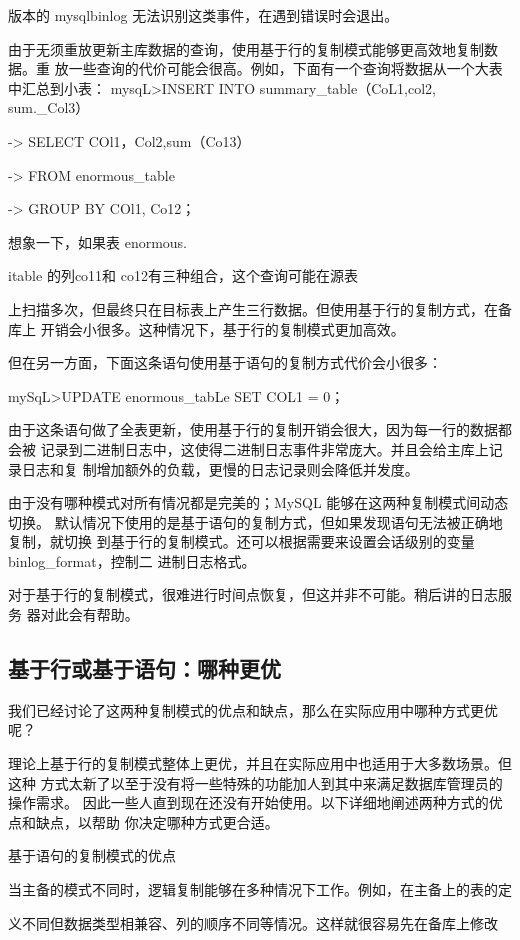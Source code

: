 版本的 mysqlbinlog 无法识别这类事件，在遇到错误时会退出。

由于无须重放更新主库数据的查询，使用基于行的复制模式能够更高效地复制数据。重
放一些查询的代价可能会很高。例如，下面有一个查询将数据从一个大表中汇总到小表：
mysqL>INSERT INTO summary\_table（CoL1,col2, sum.\_Col3）

-> SELECT COl1，Col2,sum（Co13）

-> FROM enormous\_table

-> GROUP BY COl1, Co12；

想象一下，如果表 enormous.

itable 的列co11和 co12有三种组合，这个查询可能在源表

上扫描多次，但最终只在目标表上产生三行数据。但使用基于行的复制方式，在备库上
开销会小很多。这种情况下，基于行的复制模式更加高效。

但在另一方面，下面这条语句使用基于语句的复制方式代价会小很多：

mySqL>UPDATE enormous\_tabLe SET COL1 = 0；

由于这条语句做了全表更新，使用基于行的复制开销会很大，因为每一行的数据都会被
记录到二进制日志中，这使得二进制日志事件非常庞大。并且会给主库上记录日志和复
制增加额外的负载，更慢的日志记录则会降低并发度。

由于没有哪种模式对所有情况都是完美的；MySQL 能够在这两种复制模式间动态切换。
默认情况下使用的是基于语句的复制方式，但如果发现语句无法被正确地复制，就切换
到基于行的复制模式。还可以根据需要来设置会话级别的变量 binlog\_format，控制二
进制日志格式。

对于基于行的复制模式，很难进行时间点恢复，但这并非不可能。稍后讲的日志服务
器对此会有帮助。

\subsection{基于行或基于语句：哪种更优}
我们已经讨论了这两种复制模式的优点和缺点，那么在实际应用中哪种方式更优呢？

理论上基于行的复制模式整体上更优，并且在实际应用中也适用于大多数场景。但这种
方式太新了以至于没有将一些特殊的功能加人到其中来满足数据库管理员的操作需求。
因此一些人直到现在还没有开始使用。以下详细地阐述两种方式的优点和缺点，以帮助
你决定哪种方式更合适。

基于语句的复制模式的优点

当主备的模式不同时，逻辑复制能够在多种情况下工作。例如，在主备上的表的定

义不同但数据类型相兼容、列的顺序不同等情况。这样就很容易先在备库上修改

